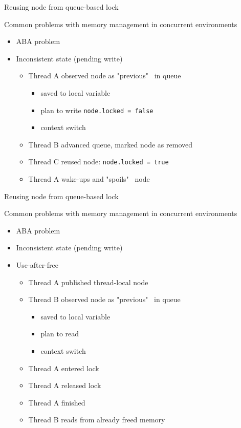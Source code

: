 \begin{frame}[t,noframenumbering]{Reusing node from queue-based lock}

Common problems with memory management in concurrent environments
\begin{itemize}
  \item ABA problem  
  \pause \item Inconsistent state (pending write)
  \begin{itemize}
    \pause \item Thread A observed node as "previous" \ in queue
    \begin{itemize}
      \pause \item saved to local variable
      \pause \item plan to write \texttt{node.locked = false}
      \pause \item context switch
     \end{itemize}
    \pause \item Thread B advanced queue, marked node as removed
    \pause \item Thread C reused node: \texttt{node.locked = true}
    \pause \item Thread A wake-ups and "spoils" \ node    
  \end{itemize}
  
\end{itemize}
\end{frame}

\begin{frame}[t,noframenumbering]{Reusing node from queue-based lock}

Common problems with memory management in concurrent environments
\begin{itemize}
  \item ABA problem  
  \item Inconsistent state (pending write)
  \pause \item Use-after-free
  \begin{itemize}
    \pause  \item Thread A published thread-local node
    \pause  \item Thread B observed node as "previous" \ in queue
    \begin{itemize}
      \pause  \item saved to local variable
      \pause  \item plan to read
      \pause \item context switch
     \end{itemize}
    \pause  \item Thread A entered lock
    \pause  \item Thread A released lock
    \pause  \item Thread A finished
    \pause  \item Thread B reads from already freed memory
  \end{itemize}
\end{itemize}
\end{frame}


